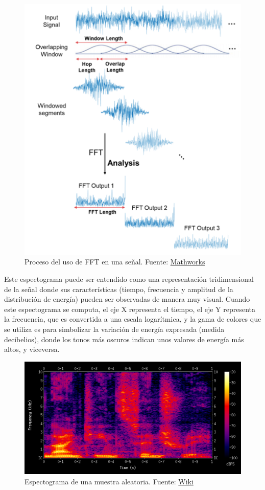 \documentclass[11pt,a4paper,spanish]{book}
\begin{document}
	\begin{figure}[H]
		\centering
		\includegraphics[scale=0.25]{processFFT.png} 
		\caption{Proceso del uso de FFT en una señal. Fuente: \href{https://www.mathworks.com/help/dsp/ref/dsp.stft.html}{Mathworks}}
	\end{figure} 
	
	
	Este espectograma puede ser entendido como una representación tridimensional de la señal donde sus características (tiempo, frecuencia y amplitud de la distribución de energía) pueden ser observadas de manera muy visual. Cuando este espectograma se computa, el eje X representa el tiempo, el eje Y representa la frecuencia, que es convertida a una escala logarítmica, y la gama de colores que se utiliza es para simbolizar la variación de energía expresada (medida decibelios), donde los tonos más oscuros indican unos valores de energía más altos, y viceversa.
	
	\begin{figure}[h]
		\centering
		\includegraphics[scale=0.3]{spectogram.png} 
		\caption{Espectograma de una muestra aleatoria. Fuente: \href{https://es.other.wiki/wiki/Spectrogram}{Wiki}}
	\end{figure}
	
\end{document}
